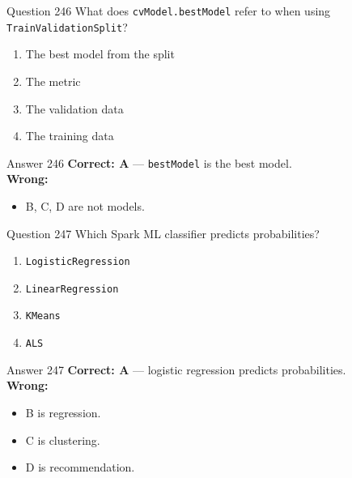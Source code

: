 \documentclass[aspectratio=169,11pt]{beamer}
\begin{document}
	\begin{frame}{Question 246}
		What does \texttt{cvModel.bestModel} refer to when using \texttt{TrainValidationSplit}?
		\begin{enumerate}[label=\Alph*.]
			\item The best model from the split
			\item The metric
			\item The validation data
			\item The training data
		\end{enumerate}
	\end{frame}
	\begin{frame}{Answer 246}
		\textbf{Correct: A} --- \texttt{bestModel} is the best model.\\
		\vspace{0.5em}
		\textbf{Wrong:}
		\begin{itemize}
			\item B, C, D are not models.
		\end{itemize}
	\end{frame}
	
	\begin{frame}{Question 247}
		Which Spark ML classifier predicts probabilities?
		\begin{enumerate}[label=\Alph*.]
			\item \texttt{LogisticRegression}
			\item \texttt{LinearRegression}
			\item \texttt{KMeans}
			\item \texttt{ALS}
		\end{enumerate}
	\end{frame}
	\begin{frame}{Answer 247}
		\textbf{Correct: A} --- logistic regression predicts probabilities.\\
		\vspace{0.5em}
		\textbf{Wrong:}
		\begin{itemize}
			\item B is regression.
			\item C is clustering.
			\item D is recommendation.
		\end{itemize}
	\end{frame}
	
\end{document}
